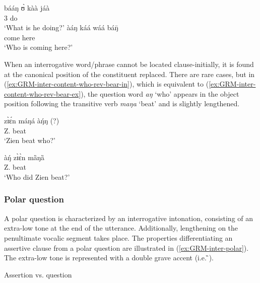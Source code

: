 \ea\label{ex:GRM-inter-content}

\ea\label{ex:GRM-inter-content-what}
\gll bááŋ ʊ̀ kàà jáà\\
{\q} {3\sg} {\ipfv} do \\
 \glt  `What is he doing?' 
\ex\label{ex:GRM-inter-content-who}
\gll àáŋ káá wáá báŋ̄\\
{\q}  {\ipfv} come here\\
\glt  `Who is coming here?'

\z 
 \z

When an interrogative word/phrase cannot be located clause-initially,  it is
found at the canonical position of the constituent replaced. There are
rare cases, but in (\ref{ex:GRM-inter-content-who-rev-bear-in}), which is
equivalent to  (\ref{ex:GRM-inter-content-who-rev-bear-ex}),  the question
word {\it aŋ} `who' appears in the object position following the transitive verb
{\it maŋa} `beat' and is slightly lengthened. 


\ea\label{ex:GRM-inter-content-who-rev-bear}

\begin{multicols}{2}
 \ea\label{ex:GRM-inter-content-who-rev-bear-in}
\gll  zɪ̀ɛ́n máŋá àŋ́ŋ (?)\\
 Z. beat {\q} \\
 \glt  `Zien beat who?'

 \ex\label{ex:GRM-inter-content-who-rev-bear-ex}
\gll  àŋ́ zɪ̀ɛ̀n mȁŋȁ\\
{\q} Z. beat \\
 \glt  `Who did Zien beat?'

\z 
\end{multicols}
 \z





\subsubsection{Polar question}
\label{sec:GRM-interr-polar}

A polar question is characterized by an interrogative intonation, consisting of
an extra-low tone at the end of the utterance. Additionally, lengthening  on the
penultimate vocalic segment takes place. The properties differentiating an
assertive clause from a polar question are illustrated in
(\ref{ex:GRM-inter-polar}). The
extra-low tone is represented with a double grave accent (i.e.  ̏). 

\ea\label{ex:GRM-inter-polar}{\rm Assertion vs. question}\\

